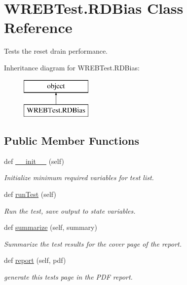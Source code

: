 \hypertarget{class_w_r_e_b_test_1_1_r_d_bias}{}\section{W\+R\+E\+B\+Test.\+R\+D\+Bias Class Reference}
\label{class_w_r_e_b_test_1_1_r_d_bias}


Tests the reset drain performance.  


Inheritance diagram for W\+R\+E\+B\+Test.\+R\+D\+Bias\+:\begin{figure}[H]
\begin{center}
\leavevmode
\includegraphics[height=2.000000cm]{class_w_r_e_b_test_1_1_r_d_bias}
\end{center}
\end{figure}
\subsection*{Public Member Functions}
\begin{DoxyCompactItemize}
\item 
def \hyperlink{class_w_r_e_b_test_1_1_r_d_bias_acc742bc1a44bbba81ab903a532aa2340}{\+\_\+\+\_\+init\+\_\+\+\_\+} (self)
\begin{DoxyCompactList}\small\item\em Initialize minimum required variables for test list. \end{DoxyCompactList}\item 
def \hyperlink{class_w_r_e_b_test_1_1_r_d_bias_aa0e5d7ab0c7193c74cd2f1940e31e46f}{run\+Test} (self)
\begin{DoxyCompactList}\small\item\em Run the test, save output to state variables. \end{DoxyCompactList}\item 
def \hyperlink{class_w_r_e_b_test_1_1_r_d_bias_ae17b85a71baa044098cd474ca12c4155}{summarize} (self, summary)
\begin{DoxyCompactList}\small\item\em Summarize the test results for the cover page of the report. \end{DoxyCompactList}\item 
def \hyperlink{class_w_r_e_b_test_1_1_r_d_bias_a411e7e21cb4b0603d8f2ed04b332ace4}{report} (self, pdf)
\begin{DoxyCompactList}\small\item\em generate this test\textquotesingle{}s page in the P\+DF report. \end{DoxyCompactList}\end{DoxyCompactItemize}


